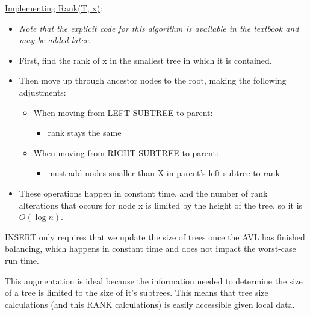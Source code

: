 \documentclass[12pt]{article}
\begin{document}
\underline{Implementing Rank(T, x)}: 
\begin{itemize}
\item \emph{Note that the explicit code for this algorithm is available in the textbook and may be added later.}
\item First, find the rank of x in the smallest tree in which it is contained.
\item Then move up through ancestor nodes to the root, making the following adjustments:
	\begin{itemize}
	\item When moving from LEFT SUBTREE to parent: 
		\begin{itemize}
		\item rank stays the same
		\end{itemize}

	\item When moving from RIGHT SUBTREE to parent:
		\begin{itemize}
		\item must add nodes smaller than X in parent's left subtree to rank
		\end{itemize}
	\end{itemize}
\item These operations happen in constant time, and the number of rank alterations that occurs for node x is limited by the height of the tree, so it is $O(\log{n})$.
\end{itemize}
\vspace{0.5cm}

INSERT only requires that we update the size of trees once the AVL has finished balancing, which happens in constant time and does not impact the worst-case run time.
\vspace{0.5cm}

This augmentation is ideal because the information needed to determine the size of a tree is limited to the size of it's subtrees. This means that tree size calculations (and this RANK calculations) is easily accessible given local data.
\end{document}
